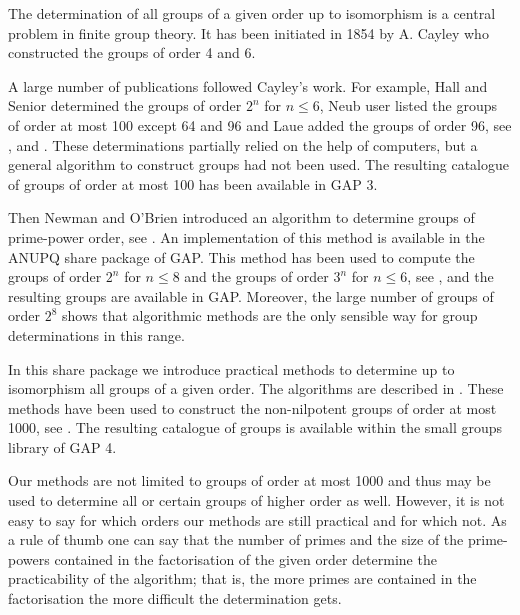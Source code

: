 

The determination of all groups of a given order up to isomorphism
is a central problem in finite group theory. It has been initiated
in 1854 by A. Cayley who constructed the groups of order 4 and 6.

A large number of publications followed Cayley's work. For example,
Hall and Senior determined the groups of order $2^n$ for $n \leq 6$,
Neub{ u}ser listed the groups of order at most 100 except 64 and 96
and Laue added the groups of order 96, see \cite{HS64}, \cite{Neu67}
and \cite{Lau82}. These determinations partially relied on the
help of computers, but a general algorithm to construct groups had
not been used. The resulting catalogue of groups of order at most
100 has been available in GAP 3.

Then Newman and O'Brien introduced an algorithm to determine
groups of prime-power order, see \cite{OBr90}. An implementation
of this method is available in the ANUPQ share package of GAP.
This method has been used to compute the groups of order $2^n$ for
$n \leq 8$ and the groups of order $3^n$ for $n \leq 6$, see
\cite{OBr88}, and the resulting groups are available in GAP.
Moreover, the large number of groups of order $2^8$ shows that
algorithmic methods are the only sensible way for group determinations
in this range.

In this share package we introduce practical methods to determine
up to isomorphism all groups of a given order. The algorithms
are described in \cite{BE99}. These methods have been used to
construct the non-nilpotent groups of order at most 1000, see
\cite{BE1000}. The resulting catalogue of groups is available within
the small groups library of GAP 4.

Our methods are not limited to groups of order at most 1000
and thus may be used to determine all or certain groups of
higher order as well. However, it is not easy to say for
which orders our methods are still practical and for which
not. As a rule of thumb one can say that the number of
primes and the size of the prime-powers contained in the
factorisation of the given order determine the practicability
of the algorithm; that is, the more primes are contained in
the factorisation the more difficult the determination gets.

